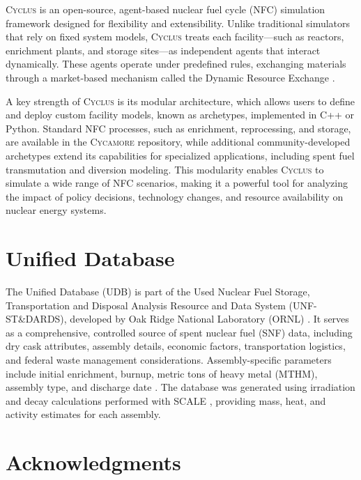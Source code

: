 \documentclass{anstrans}
\newcommand{\cycamore}{\textsc{Cycamore}\xspace}
\newcommand{\cyclus}{\textsc{Cyclus}\xspace}
\begin{document}
\cyclus \cite{huff_fundamental_2016} is an open-source, agent-based nuclear fuel cycle (NFC) simulation framework designed for flexibility and extensibility. Unlike traditional simulators that rely on fixed system models, \cyclus treats each facility—such as reactors, enrichment plants, and storage sites—as independent agents that interact dynamically. These agents operate under predefined rules, exchanging materials through a market-based mechanism called the Dynamic Resource Exchange \cite{gidden_methodology_2016}.

A key strength of \cyclus is its modular architecture, which allows users to define and deploy custom facility models, known as archetypes, implemented in C++ or Python. Standard NFC processes, such as enrichment, reprocessing, and storage, are available in the \cycamore \cite{carlsen_cycamore_2014} repository, while additional community-developed archetypes extend its capabilities for specialized applications, including spent fuel transmutation and diversion modeling. This modularity enables \cyclus to simulate a wide range of NFC scenarios, making it a powerful tool for analyzing the impact of policy decisions, technology changes, and resource availability on nuclear energy systems.
\section{Unified Database}

The Unified Database (UDB) is part of the Used Nuclear Fuel Storage, Transportation and Disposal Analysis Resource and Data System (UNF-ST\&DARDS), developed by Oak Ridge National Laboratory (ORNL) \cite{peterson_used_2013}. It serves as a comprehensive, controlled source of spent nuclear fuel (SNF) data, including dry cask attributes, assembly details, economic factors, transportation logistics, and federal waste management considerations. Assembly-specific parameters include initial enrichment, burnup, metric tons of heavy metal (MTHM), assembly type, and discharge date \cite{peterson_fuel_2015}. The database was generated using irradiation and decay calculations performed with SCALE \cite{bowman_scale_2011}, providing mass, heat, and activity estimates for each assembly.

\section{Acknowledgments}
\end{document}
